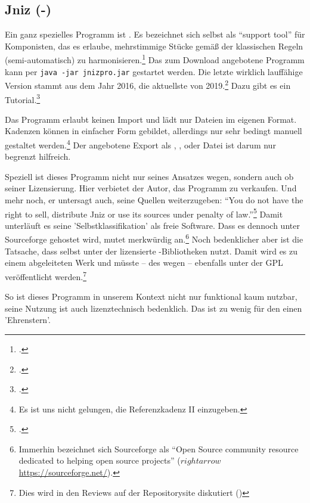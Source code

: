 %
%
%

\subsection{Jniz (-)}

\label{Jniz}Ein ganz spezielles Programm ist . Es bezeichnet sich
selbst als \enquote{support tool} für Komponisten, das es erlaube, mehrstimmige
Stücke gemäß der klassischen Regeln (semi-automatisch) zu
harmonisieren.\footcite[vgl.][\nopage wp.]{Grandjean2019a} Das zum Download
angebotene Programm kann per \texttt{java -jar jnizpro.jar} gestartet werden.
Die letzte wirklich lauffähige Version stammt aus dem Jahr 2016, die aktuellste
von 2019.\footcite[vgl.][\nopage wp.]{Jniz2019b} Dazu gibt es ein
Tutorial.\footcite[vgl.][\nopage wp.]{Grandjean2019c}

Das Programm erlaubt keinen Import und lädt nur Dateien im eigenen Format.
Kadenzen können in einfacher Form gebildet, allerdings nur sehr bedingt manuell
gestaltet werden.\footnote{Es ist uns nicht gelungen, die Referenzkadenz II
einzugeben.} Der angebotene Export als , ,
 oder Datei ist darum nur begrenzt hilfreich.

Speziell ist dieses Programm nicht nur seines Ansatzes wegen, sondern auch ob
seiner Lizensierung. Hier verbietet der Autor, das Programm zu verkaufen. Und
mehr noch, er untersagt auch, seine Quellen weiterzugeben: \enquote{You do not
have the right to sell, distribute Jniz or use its sources under penalty of
law.}\footcite[vgl.][\nopage wp.]{Grandjean2019b} Damit unterläuft es seine
'Selbstklassifikation' als freie Software. Dass es dennoch unter Sourceforge
gehostet wird, mutet merkwürdig an.\footnote{Immerhin bezeichnet sich
Sourceforge als \enquote{Open Source community resource dedicated to helping
open source projects} ($rightarrow$ \href{https://sourceforge.net/}
{https://sourceforge.net/}).} Noch bedenklicher aber ist die Tatsache, dass
 selbst unter der  lizensierte -Bibliotheken
nutzt. Damit wird es zu einem abgeleiteten Werk und müsste -- des
 wegen -- ebenfalls unter der GPL veröffentlicht
werden.\footnote{Dies wird in den Reviews auf der Repositorysite diskutiert
(\cite[vgl.][\nopage wp.]{Jniz2019a})}

So ist dieses Programm in unserem Kontext nicht nur funktional kaum nutzbar,
seine Nutzung ist auch lizenztechnisch bedenklich. Das ist zu wenig für den
einen 'Ehrenstern'.



%
